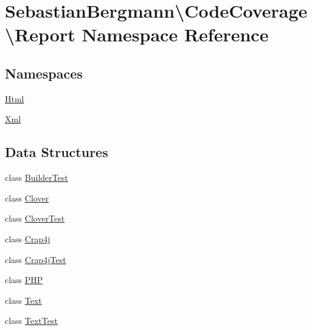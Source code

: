 \hypertarget{namespace_sebastian_bergmann_1_1_code_coverage_1_1_report}{}\section{Sebastian\+Bergmann\textbackslash{}Code\+Coverage\textbackslash{}Report Namespace Reference}
\label{namespace_sebastian_bergmann_1_1_code_coverage_1_1_report}
\subsection*{Namespaces}
\begin{DoxyCompactItemize}
\item 
 \mbox{\hyperlink{namespace_sebastian_bergmann_1_1_code_coverage_1_1_report_1_1_html}{Html}}
\item 
 \mbox{\hyperlink{namespace_sebastian_bergmann_1_1_code_coverage_1_1_report_1_1_xml}{Xml}}
\end{DoxyCompactItemize}
\subsection*{Data Structures}
\begin{DoxyCompactItemize}
\item 
class \mbox{\hyperlink{class_sebastian_bergmann_1_1_code_coverage_1_1_report_1_1_builder_test}{Builder\+Test}}
\item 
class \mbox{\hyperlink{class_sebastian_bergmann_1_1_code_coverage_1_1_report_1_1_clover}{Clover}}
\item 
class \mbox{\hyperlink{class_sebastian_bergmann_1_1_code_coverage_1_1_report_1_1_clover_test}{Clover\+Test}}
\item 
class \mbox{\hyperlink{class_sebastian_bergmann_1_1_code_coverage_1_1_report_1_1_crap4j}{Crap4j}}
\item 
class \mbox{\hyperlink{class_sebastian_bergmann_1_1_code_coverage_1_1_report_1_1_crap4j_test}{Crap4j\+Test}}
\item 
class \mbox{\hyperlink{class_sebastian_bergmann_1_1_code_coverage_1_1_report_1_1_p_h_p}{P\+HP}}
\item 
class \mbox{\hyperlink{class_sebastian_bergmann_1_1_code_coverage_1_1_report_1_1_text}{Text}}
\item 
class \mbox{\hyperlink{class_sebastian_bergmann_1_1_code_coverage_1_1_report_1_1_text_test}{Text\+Test}}
\end{DoxyCompactItemize}
